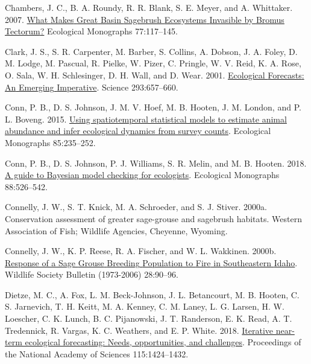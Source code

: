 \documentclass[
  12pt,
]{article}
\newlength{\cslhangindent}
\newlength{\cslentryspacingunit} %
\newenvironment{CSLReferences}[2] %
 {%
  \setlength{\parindent}{0pt}
  \ifodd #1
  \let\oldpar\par
  \def\par{\hangindent=\cslhangindent\oldpar}
  \fi
  \setlength{\parskip}{#2\cslentryspacingunit}
 }%
 {}
\begin{document}
\begin{CSLReferences}{1}{0}
\leavevmode{}%
Chambers, J. C., B. A. Roundy, R. R. Blank, S. E. Meyer, and A. Whittaker. 2007. \href{https://doi.org/10.1890/05-1991}{What {Makes} {Great} {Basin} {Sagebrush} {Ecosystems} {Invasible} by {Bromus} {Tectorum}?} Ecological Monographs 77:117--145.

\leavevmode{}%
Clark, J. S., S. R. Carpenter, M. Barber, S. Collins, A. Dobson, J. A. Foley, D. M. Lodge, M. Pascual, R. Pielke, W. Pizer, C. Pringle, W. V. Reid, K. A. Rose, O. Sala, W. H. Schlesinger, D. H. Wall, and D. Wear. 2001. \href{https://doi.org/10.1126/science.293.5530.657}{Ecological {Forecasts}: {An} {Emerging} {Imperative}}. Science 293:657--660.

\leavevmode{}%
Conn, P. B., D. S. Johnson, J. M. V. Hoef, M. B. Hooten, J. M. London, and P. L. Boveng. 2015. \href{https://doi.org/10.1890/14-0959.1}{Using spatiotemporal statistical models to estimate animal abundance and infer ecological dynamics from survey counts}. Ecological Monographs 85:235--252.

\leavevmode{}%
Conn, P. B., D. S. Johnson, P. J. Williams, S. R. Melin, and M. B. Hooten. 2018. \href{https://doi.org/10.1002/ecm.1314}{A guide to {Bayesian} model checking for ecologists}. Ecological Monographs 88:526--542.

\leavevmode{}%
Connelly, J. W., S. T. Knick, M. A. Schroeder, and S. J. Stiver. 2000a. Conservation assessment of greater sage-grouse and sagebrush habitats. Western Association of Fish; Wildlife Agencies, Cheyenne, Wyoming.

\leavevmode{}%
Connelly, J. W., K. P. Reese, R. A. Fischer, and W. L. Wakkinen. 2000b. \href{https://www.jstor.org/stable/4617288}{Response of a {Sage} {Grouse} {Breeding} {Population} to {Fire} in {Southeastern} {Idaho}}. Wildlife Society Bulletin (1973-2006) 28:90--96.

\leavevmode{}%
Dietze, M. C., A. Fox, L. M. Beck-Johnson, J. L. Betancourt, M. B. Hooten, C. S. Jarnevich, T. H. Keitt, M. A. Kenney, C. M. Laney, L. G. Larsen, H. W. Loescher, C. K. Lunch, B. C. Pijanowski, J. T. Randerson, E. K. Read, A. T. Tredennick, R. Vargas, K. C. Weathers, and E. P. White. 2018. \href{https://doi.org/10.1073/pnas.1710231115}{Iterative near-term ecological forecasting: {Needs}, opportunities, and challenges}. Proceedings of the National Academy of Sciences 115:1424--1432.


\end{CSLReferences}
\end{document}

